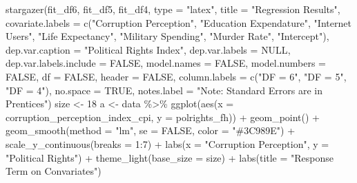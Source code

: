 \documentclass[
  english,
  man,floatsintext]{apa6}
\newenvironment{Shaded}{\begin{snugshade}}{\end{snugshade}}
\newcommand{\AttributeTok}[1]{\textcolor[rgb]{0.77,0.63,0.00}{#1}}
\newcommand{\ConstantTok}[1]{\textcolor[rgb]{0.00,0.00,0.00}{#1}}
\newcommand{\DecValTok}[1]{\textcolor[rgb]{0.00,0.00,0.81}{#1}}
\newcommand{\FunctionTok}[1]{\textcolor[rgb]{0.00,0.00,0.00}{#1}}
\newcommand{\NormalTok}[1]{#1}
\newcommand{\OtherTok}[1]{\textcolor[rgb]{0.56,0.35,0.01}{#1}}
\newcommand{\SpecialCharTok}[1]{\textcolor[rgb]{0.00,0.00,0.00}{#1}}
\newcommand{\StringTok}[1]{\textcolor[rgb]{0.31,0.60,0.02}{#1}}
\begin{document}
\begin{Shaded}
\begin{Highlighting}[]
\FunctionTok{stargazer}\NormalTok{(fit\_df6, fit\_df5, fit\_df4, }
                     \AttributeTok{type =} \StringTok{"latex"}\NormalTok{, }
                     \AttributeTok{title =} \StringTok{"Regression Results"}\NormalTok{, }
                     \AttributeTok{covariate.labels =} \FunctionTok{c}\NormalTok{(}\StringTok{"Corruption Perception"}\NormalTok{, }
                                          \StringTok{"Education Expendature"}\NormalTok{,}
                                          \StringTok{"Internet Users"}\NormalTok{, }
                                          \StringTok{"Life Expectancy"}\NormalTok{,}
                                          \StringTok{"Military Spending"}\NormalTok{, }
                                          \StringTok{"Murder Rate"}\NormalTok{, }
                                          \StringTok{"Intercept"}\NormalTok{),}
                     \AttributeTok{dep.var.caption =} \StringTok{"Political Rights Index"}\NormalTok{,}
                     \AttributeTok{dep.var.labels =} \ConstantTok{NULL}\NormalTok{,}
                     \AttributeTok{dep.var.labels.include =} \ConstantTok{FALSE}\NormalTok{, }
                     \AttributeTok{model.names =} \ConstantTok{FALSE}\NormalTok{,}
                     \AttributeTok{model.numbers =} \ConstantTok{FALSE}\NormalTok{,}
                     \AttributeTok{df =} \ConstantTok{FALSE}\NormalTok{, }
                     \AttributeTok{header =} \ConstantTok{FALSE}\NormalTok{,}
                     \AttributeTok{column.labels =} \FunctionTok{c}\NormalTok{(}\StringTok{"DF = 6"}\NormalTok{, }\StringTok{"DF = 5"}\NormalTok{, }\StringTok{"DF = 4"}\NormalTok{),}
                     \AttributeTok{no.space =} \ConstantTok{TRUE}\NormalTok{, }
                     \AttributeTok{notes.label =} \StringTok{"Note: Standard Errors are in Prentices"}\NormalTok{)}
\NormalTok{size }\OtherTok{\textless{}{-}} \DecValTok{18}
\NormalTok{a }\OtherTok{\textless{}{-}}\NormalTok{ data }\SpecialCharTok{\%\textgreater{}\%} 
  \FunctionTok{ggplot}\NormalTok{(}\FunctionTok{aes}\NormalTok{(}\AttributeTok{x =}\NormalTok{ corruption\_perception\_index\_cpi, }\AttributeTok{y =}\NormalTok{ polrights\_fh)) }\SpecialCharTok{+} 
  \FunctionTok{geom\_point}\NormalTok{() }\SpecialCharTok{+} 
  \FunctionTok{geom\_smooth}\NormalTok{(}\AttributeTok{method =} \StringTok{"lm"}\NormalTok{, }\AttributeTok{se =} \ConstantTok{FALSE}\NormalTok{, }\AttributeTok{color =} \StringTok{"\#3C989E"}\NormalTok{) }\SpecialCharTok{+} 
  \FunctionTok{scale\_y\_continuous}\NormalTok{(}\AttributeTok{breaks =} \DecValTok{1}\SpecialCharTok{:}\DecValTok{7}\NormalTok{) }\SpecialCharTok{+} 
  \FunctionTok{labs}\NormalTok{(}\AttributeTok{x =} \StringTok{"Corruption Perception"}\NormalTok{, }\AttributeTok{y =} \StringTok{"Political Rights"}\NormalTok{) }\SpecialCharTok{+}
  \FunctionTok{theme\_light}\NormalTok{(}\AttributeTok{base\_size =}\NormalTok{ size) }\SpecialCharTok{+} \FunctionTok{labs}\NormalTok{(}\AttributeTok{title =} \StringTok{"Response Term on Convariates"}\NormalTok{)}


\end{Highlighting}
\end{Shaded}
\end{document}
